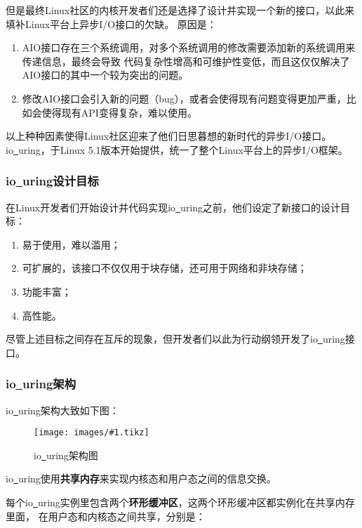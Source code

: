 \documentclass[supercite]{HustGraduPaper}
\newcommand{\cfig}[3]{
  \begin{figure}[htb]
    \centering
    \texttt{[image: images/\#1.tikz]}
    \caption{#3}
    \label{fig:#1}
  \end{figure}
}
\theoremstyle{definition}
\begin{document}
但是最终Linux社区的内核开发者们还是选择了设计并实现一个新的接口，以此来填补Linux平台上异步I/O接口的欠缺。
原因是：

\begin{enumerate}
  \item AIO接口存在三个系统调用，对多个系统调用的修改需要添加新的系统调用来传递信息，最终会导致
    代码复杂性增高和可维护性变低，而且这仅仅解决了AIO接口的其中一个较为突出的问题。
  \item 修改AIO接口会引入新的问题（bug），或者会使得现有问题变得更加严重，比如会使得现有API变得复杂，难以使用。
\end{enumerate}

以上种种因素使得Linux社区迎来了他们日思暮想的新时代的异步I/O接口。
io\underline{~}uring，于Linux 5.1版本开始提供，统一了整个Linux平台上的异步I/O框架。\par

\subsubsection{io\underline{~}uring设计目标}
在Linux开发者们开始设计并代码实现io\underline{~}uring之前，他们设定了新接口的设计目标：

\begin{enumerate}
  \item 易于使用，难以滥用；
  \item 可扩展的，该接口不仅仅用于块存储，还可用于网络和非块存储；
  \item 功能丰富；
  \item 高性能。
\end{enumerate}

尽管上述目标之间存在互斥的现象，但开发者们以此为行动纲领开发了io\underline{~}uring接口。\par

\subsubsection{io\underline{~}uring架构}
io\underline{~}uring架构大致如下图：\par

\cfig{io-uring}{0.8}{io\underline{~}uring架构图}

io\underline{~}uring使用\textbf{共享内存}来实现内核态和用户态之间的信息交换。\par

每个io\underline{~}uring实例里包含两个\textbf{环形缓冲区}，这两个环形缓冲区都实例化在共享内存里面，
在用户态和内核态之间共享，分别是：
\end{document}
